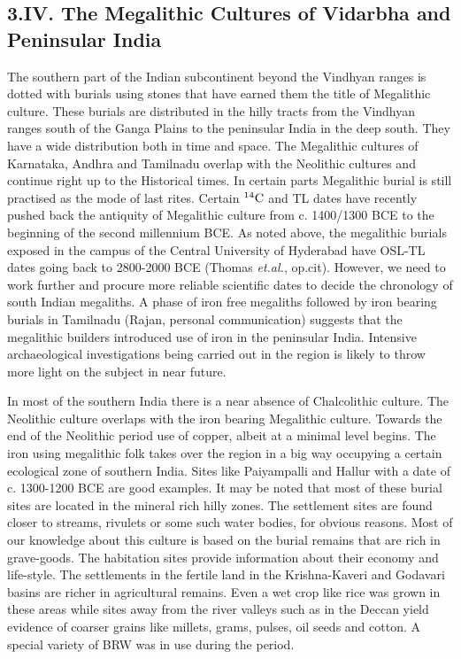 \subsection*{3.IV. The Megalithic Cultures of Vidarbha and Peninsular India}\label{subsection-11}

The southern part of the Indian subcontinent beyond the Vindhyan ranges is dotted with burials using stones that have earned them the title of Megalithic culture. These burials are distributed in the hilly tracts from the Vindhyan ranges south of the Ganga Plains to the peninsular India in the deep south. They have a wide distribution both in time and space. The Megalithic cultures of Karnataka, Andhra and Tamilnadu overlap with the Neolithic cultures and continue right up to the Historical times. In certain parts Megalithic burial is still practised as the mode of last rites. Certain $^{14}{\rm C}$ and TL dates have recently pushed back the antiquity of Megalithic culture from c. 1400/1300 BCE to the beginning of the second millennium BCE. As noted above, the megalithic burials exposed in the campus of the Central University of Hyderabad have OSL-TL dates going back to 2800-2000 BCE (Thomas \textit{et.al.}, op.cit). However, we need to work further and procure more reliable scientific dates to decide the chronology of south Indian megaliths. A phase of iron free megaliths followed by iron bearing burials in Tamilnadu (Rajan, personal communication) suggests that the megalithic builders introduced use of iron in the peninsular India. Intensive archaeological investigations being carried out in the region is likely to throw more light on the subject in near future.

In most of the southern India there is a near absence of Chalcolithic culture. The Neolithic culture overlaps with the iron bearing Megalithic culture. Towards the end of the Neolithic period use of copper, albeit at a minimal level begins. The iron using megalithic folk takes over the region in a big way occupying a certain ecological zone of southern India. Sites like Paiyampalli and Hallur with a date of c. 1300-1200 BCE are good examples. It may be noted that most of these burial sites are located in the mineral rich hilly zones. The settlement sites are found closer to streams, rivulets or some such water bodies, for obvious reasons. Most of our knowledge about this culture is based on the burial remains that are rich in grave-goods. The habitation sites provide information about their economy and life-style. The settlements in the fertile land in the Krishna-Kaveri and Godavari basins are richer in agricultural remains. Even a wet crop like rice was grown in these areas while sites away from the river valleys such as in the Deccan yield evidence of coarser grains like millets, grams, pulses, oil seeds and cotton. A special variety of BRW was in use during the period. 

